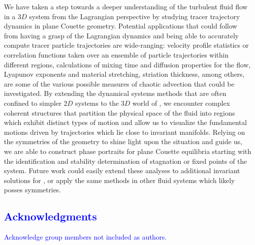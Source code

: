 \documentclass[letter,12pt,openany]{article}
\begin{document}
We have taken a step towards a deeper understanding of the  turbulent 
fluid flow in a $3D$ system from the Lagrangian perspective by studying 
tracer trajectory dynamics in plane Couette geometry. Potential 
applications that could follow from having a grasp of the Lagrangian 
dynamics and being able to accurately compute tracer particle 
trajectories are wide-ranging: velocity profile statistics or correlation 
functions taken over an ensemble of particle trajectories within 
different regions, calculations of mixing time and diffusion properties 
for the flow, Lyapunov exponents and material stretching, striation 
thickness, among others, are some of the various possible measures of 
chaotic advection that could be investigated. By extending the dynamical 
systems methods that are often confined to simpler $2D$ systems to the 
$3D$ world of {\pCf}, we encounter complex coherent structures that 
partition the physical space of the fluid into regions which exhibit 
distinct types of motion and allow us to visualize the fundamental 
motions driven by trajectories which lie close to invariant manifolds. 
Relying on the symmetries of the geometry to shine light upon the 
situation and guide us, we are able to construct phase portraits for 
plane Couette equilibria starting with the identification and stability 
determination of stagnation or fixed points of the system. Future work 
could easily extend these analyses to additional invariant solutions for 
{\pCf}, or apply the same methods in other fluid systems which likely 
posses symmetries. 

\ifboyscout\textcolor{blue}{
\section{Acknowledgments}
Acknowledge group members not included as authors.
        }\fi %


\end{document}
